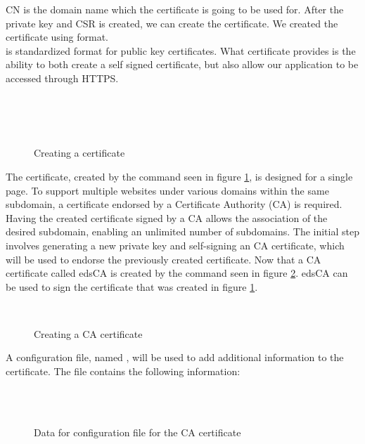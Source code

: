 \ac{CN} is the domain name which the certificate is going to be used for.
After the private key and \ac{CSR} is created, we can create the certificate. We created the certificate using  format.\\
\cite{x509} is standardized format for public key certificates. What  certificate provides is the ability
to both create a self signed certificate, but also allow our application to be accessed through \ac{HTTPS}.\\
\begin{figure}[h]
    \begin{center}
    \\
    \\
     \\
\end{center}
    \caption{Creating a certificate}
    \label{fig:cert-creation}
\end{figure}
The certificate, created by the command seen in figure \ref{fig:cert-creation}, is designed for a single page. 
To support multiple websites under various domains within the same subdomain, 
a certificate endorsed by a Certificate Authority (CA) is required.\\
Having the created certificate signed by 
a CA allows the association of the desired subdomain, enabling an unlimited number of subdomains. 
The initial step involves generating a new private key and self-signing 
an CA certificate, which will be used to endorse the previously created certificate.
Now that a CA certificate called edsCA is created by the command seen in figure \ref{fig:ca-cert}.
edsCA can be used to sign the certificate that was created in figure \ref{fig:cert-creation}.\\
\begin{figure}[h]
    \begin{center}
         \\
    \end{center}
    \caption{Creating a CA certificate}
    \label{fig:ca-cert}
\end{figure}
A configuration file, named , will be used to add additional information to the certificate. 
The  file contains the following information:
\begin{figure}[h]
    \begin{center}
         \\
         \\
    \end{center}
    \caption{Data for configuration file for the CA certificate}
    \label{fig:ca-cert-ext}
\end{figure}
